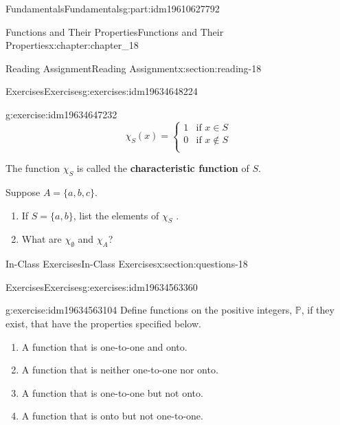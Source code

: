 \documentclass[oneside,10pt,]{book}
\newcommand{\terminology}[1]{\textbf{#1}}
\numberwithin{equation}{section}
\begin{document}
\begin{partptx}{Fundamentals}{}{Fundamentals}{}{}{g:part:idm19610627792}
\begin{chapterptx}{Functions and Their Properties}{}{Functions and Their Properties}{}{}{x:chapter:chapter_18}
\begin{sectionptx}{Reading Assignment}{}{Reading Assignment}{}{}{x:section:reading-18}
\begin{exercises-subsection-numberless}{Exercises}{}{Exercises}{}{}{g:exercises:idm19634648224}
\begin{exercisegroup}
\begin{divisionexerciseeg}{2}{}{}{g:exercise:idm19634647232}
\begin{equation*}
\chi_S(x)= \left\{
\begin{array}{cc}
1 & \textrm{if } x\in S \\
0 & \textrm{if } x\notin S \\
\end{array}
\right.
\end{equation*}
%
\par
The function \(\chi_S\) is called the \terminology{characteristic function} of \(S\).%
\par
Suppose \(A = \{a, b, c\}\).%
\begin{enumerate}[label=(\alph*)]
\item{}If  \(S = \{a, b\}\), list the elements of \(\chi_S\) .%
\item{}What are \(\chi_{\emptyset}\) and \(\chi_A\)?%
\end{enumerate}
%
\end{divisionexerciseeg}%
\end{exercisegroup}
\par\medskip\noindent
\end{exercises-subsection-numberless}
\end{sectionptx}
%
%
\typeout{************************************************}
\typeout{************************************************}
%
\begin{sectionptx}{In-Class Exercises}{}{In-Class Exercises}{}{}{x:section:questions-18}
%
%
%
\typeout{************************************************}
\typeout{************************************************}
%
\begin{exercises-subsection-numberless}{Exercises}{}{Exercises}{}{}{g:exercises:idm19634563360}
\par\medskip\noindent%
%
\begin{exercisegroup}
\begin{divisionexerciseeg}{1}{}{}{g:exercise:idm19634563104}%
Define functions on the positive integers, \(\mathbb{P}\), if they exist, that have the properties specified below.%
\begin{enumerate}[label=(\alph*)]
\item{}A function that is one-to-one and onto.%
\item{}A function that is neither one-to-one nor onto.%
\item{}A function that is one-to-one but not onto.%
\item{}A function that is onto but not one-to-one.%

\end{enumerate}
\end{divisionexerciseeg}
\end{exercisegroup}
\end{exercises-subsection-numberless}
\end{sectionptx}
\end{chapterptx}
\end{partptx}
\end{document}
